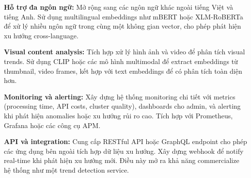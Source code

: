 \textbf{Hỗ trợ đa ngôn ngữ:} Mở rộng sang các ngôn ngữ khác ngoài tiếng Việt và tiếng Anh. Sử dụng multilingual embeddings như mBERT hoặc XLM-RoBERTa để xử lý nhiều ngôn ngữ trong cùng một không gian vector, cho phép phát hiện xu hướng cross-language.

\textbf{Visual content analysis:} Tích hợp xử lý hình ảnh và video để phân tích visual trends. Sử dụng CLIP hoặc các mô hình multimodal để extract embeddings từ thumbnail, video frames, kết hợp với text embeddings để có phân tích toàn diện hơn.

\textbf{Monitoring và alerting:} Xây dựng hệ thống monitoring chi tiết với metrics (processing time, API costs, cluster quality), dashboards cho admin, và alerting khi phát hiện anomalies hoặc xu hướng rủi ro cao. Tích hợp với Prometheus, Grafana hoặc các công cụ APM.

\textbf{API và integration:} Cung cấp RESTful API hoặc GraphQL endpoint cho phép các ứng dụng bên ngoài tích hợp dữ liệu xu hướng. Xây dựng webhook để notify real-time khi phát hiện xu hướng mới. Điều này mở ra khả năng commercialize hệ thống như một trend detection service.
